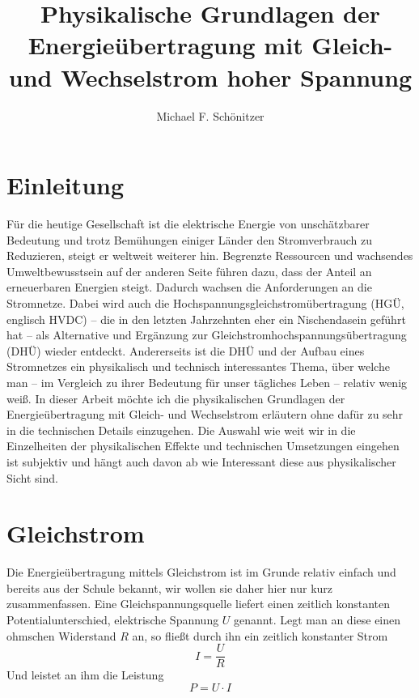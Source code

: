 \documentclass[10pt,a4paper]{article}
\author{Michael F. Schönitzer}
\title{Physikalische Grundlagen der Energieübertragung mit Gleich- und Wechselstrom hoher Spannung }
\begin{document}
\maketitle

\section{Einleitung}
Für die heutige Gesellschaft ist die elektrische Energie von unschätzbarer Bedeutung und trotz Bemühungen einiger Länder den Stromverbrauch zu Reduzieren, steigt er weltweit weiterer hin. Begrenzte Ressourcen und wachsendes Umweltbewusstsein auf der anderen Seite führen dazu, dass der Anteil an erneuerbaren Energien steigt. Dadurch wachsen die Anforderungen an die Stromnetze. Dabei wird auch die Hochspannungsgleichstromübertragung (HGÜ, englisch HVDC) -- die in den letzten Jahrzehnten eher ein Nischendasein geführt hat -- als Alternative und Ergänzung zur Gleichstromhochspannungsübertragung (DHÜ) wieder entdeckt.
Andererseits ist die DHÜ und der Aufbau eines Stromnetzes ein physikalisch und technisch interessantes Thema, über welche man -- im Vergleich zu ihrer Bedeutung für unser tägliches Leben -- relativ wenig weiß.
In dieser Arbeit möchte ich die physikalischen Grundlagen der Energieübertragung mit Gleich- und Wechselstrom erläutern ohne dafür zu sehr in die technischen Details einzugehen. Die Auswahl wie weit wir in die Einzelheiten der physikalischen Effekte und technischen Umsetzungen eingehen ist subjektiv und hängt auch davon ab wie Interessant diese aus physikalischer Sicht sind.

\section{Gleichstrom}
Die Energieübertragung mittels Gleichstrom ist im Grunde relativ einfach und bereits aus der Schule bekannt, wir wollen sie daher hier nur kurz zusammenfassen.
Eine Gleichspannungsquelle liefert einen zeitlich konstanten Potentialunterschied, elektrische Spannung $U$ genannt. Legt man an diese einen ohmschen Widerstand $R$ an, so fließt durch ihn ein zeitlich konstanter Strom
\begin{equation}
I = \frac{U}{R}
\end{equation}
Und leistet an ihm die Leistung
\begin{equation}
P = U \cdot I
\end{equation}


\end{document}
